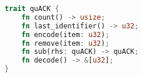 \begin{lstfloat}[t]
\begin{lstlisting}[language=Rust]
trait quACK {
    fn count() -> usize;
    fn last_identifier() -> u32;
    fn encode(item: u32);
    fn remove(item: u32);
    fn sub(rhs: quACK) -> quACK;
    fn decode() -> &[u32];
}
\end{lstlisting}
\label{lst:quack:api}
\end{lstfloat}
